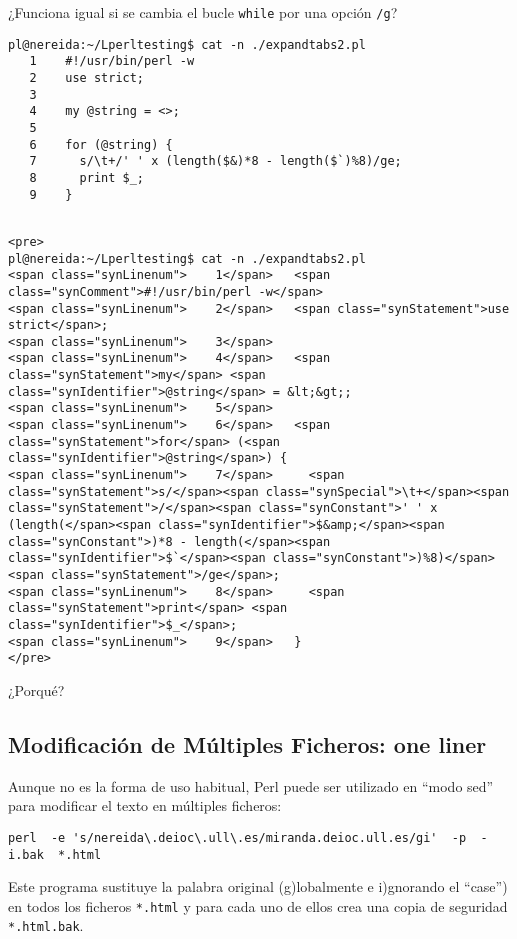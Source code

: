 \begin{exercise}
¿Funciona igual si se cambia el bucle \verb|while| por una opción \verb|/g|?
\begin{latexonly}
\begin{verbatim}
pl@nereida:~/Lperltesting$ cat -n ./expandtabs2.pl
   1    #!/usr/bin/perl -w
   2    use strict;
   3  
   4    my @string = <>;
   5  
   6    for (@string) {
   7      s/\t+/' ' x (length($&)*8 - length($`)%8)/ge;
   8      print $_;
   9    }
\end{verbatim}
\end{latexonly}
\begin{verbatim}

<pre>
pl@nereida:~/Lperltesting$ cat -n ./expandtabs2.pl
<span class="synLinenum">    1</span>   <span class="synComment">#!/usr/bin/perl -w</span>
<span class="synLinenum">    2</span>   <span class="synStatement">use strict</span>;
<span class="synLinenum">    3</span> 
<span class="synLinenum">    4</span>   <span class="synStatement">my</span> <span class="synIdentifier">@string</span> = &lt;&gt;;
<span class="synLinenum">    5</span> 
<span class="synLinenum">    6</span>   <span class="synStatement">for</span> (<span class="synIdentifier">@string</span>) {
<span class="synLinenum">    7</span>     <span class="synStatement">s/</span><span class="synSpecial">\t+</span><span class="synStatement">/</span><span class="synConstant">' ' x (length(</span><span class="synIdentifier">$&amp;</span><span class="synConstant">)*8 - length(</span><span class="synIdentifier">$`</span><span class="synConstant">)%8)</span><span class="synStatement">/ge</span>;
<span class="synLinenum">    8</span>     <span class="synStatement">print</span> <span class="synIdentifier">$_</span>;
<span class="synLinenum">    9</span>   }
</pre>

\end{verbatim}
¿Porqué?
\end{exercise}

\subsection{Modificación de Múltiples Ficheros: one liner}
Aunque no es la forma de uso habitual, Perl puede ser utilizado en ``modo sed'' para modificar el texto en múltiples ficheros: 

\verb|perl  -e 's/nereida\.deioc\.ull\.es/miranda.deioc.ull.es/gi'  -p  -i.bak  *.html|

Este programa sustituye la palabra original (g)lobalmente e i)gnorando el ``case'') en todos los ficheros \verb|*.html| y para cada uno de ellos crea una copia de seguridad \verb|*.html.bak|. 

